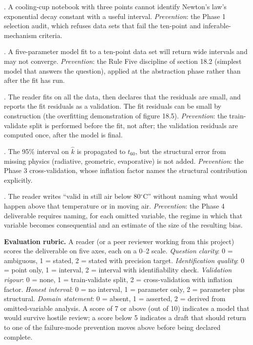 \begin{project}
. A cooling-cup notebook with three points
cannot identify Newton's law's exponential decay constant with a
useful interval. \textit{Prevention}: the Phase 1 selection
audit, which refuses data sets that fail the ten-point and
inferable-mechanism criteria.

. A
five-parameter model fit to a ten-point data set will return wide
intervals and may not converge. \textit{Prevention}: the Rule
Five discipline of section 18.2 (simplest model that answers the
question), applied at the abstraction phase rather than after the
fit has run.

.
The reader fits on all the data, then declares that the
residuals are small, and reports the fit residuals as a
validation. The fit residuals can be small by construction (the
overfitting demonstration of figure 18.5). \textit{Prevention}:
the train-validate split is performed before the fit, not after;
the validation residuals are computed once, after the model is
final.

. The 95\% interval on $\hat k$ is propagated to
$t_{60}$, but the structural error from missing physics
(radiative, geometric, evaporative) is not added.
\textit{Prevention}: the Phase 3 cross-validation, whose
inflation factor names the structural contribution explicitly.

. The reader writes ``valid in still air below
80$^\circ$C'' without naming what would happen above that
temperature or in moving air. \textit{Prevention}: the Phase 4
deliverable requires naming, for each omitted variable, the
regime in which that variable becomes consequential and an
estimate of the size of the resulting bias.

\smallskip
\textbf{Evaluation rubric.} A reader (or a peer reviewer working
from this project) scores the deliverable on five axes, each on a
0--2 scale. \textit{Question clarity}: 0 = ambiguous, 1 = stated,
2 = stated with precision target. \textit{Identification quality}:
0 = point only, 1 = interval, 2 = interval with identifiability
check. \textit{Validation rigour}: 0 = none, 1 = train-validate
split, 2 = cross-validation with inflation factor.
\textit{Honest interval}: 0 = no interval, 1 = parameter only, 2 =
parameter plus structural. \textit{Domain statement}: 0 = absent,
1 = asserted, 2 = derived from omitted-variable analysis. A score
of 7 or above (out of 10) indicates a model that would survive
hostile review; a score below 5 indicates a draft that should
return to one of the failure-mode prevention moves above before
being declared complete.
\end{project}

